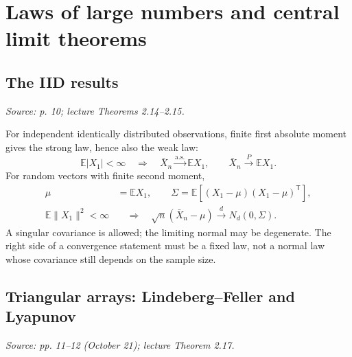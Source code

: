 \documentclass[12pt]{article}
\newcommand{\E}{\mathbb E}
\begin{document}
\section{Laws of large numbers and central limit theorems}
\subsection{The IID results}
\textit{Source: p. 10; lecture Theorems 2.14--2.15.}

For independent identically distributed observations, finite first absolute
moment gives the strong law, hence also the weak law:
\begin{equation}
 \E|X_1|<\infty\quad\Longrightarrow\quad
 \bar X_n\xrightarrow{\mathrm{a.s.}}\E X_1,
 \qquad\bar X_n\xrightarrow{P}\E X_1.
\end{equation}
For random vectors with finite second moment,
\begin{align}
 \mu&=\E X_1,\qquad\Sigma=\E[(X_1-\mu)(X_1-\mu)^{\mathsf T}],\\
 \E\|X_1\|^2<\infty
 &\quad\Longrightarrow\quad\sqrt n(\bar X_n-\mu)\xrightarrow{d}N_d(0,\Sigma).
\end{align}
A singular covariance is allowed; the limiting normal may be degenerate.
The right side of a convergence statement must be a fixed law, not a normal
law whose covariance still depends on the sample size.

\subsection{Triangular arrays: Lindeberg--Feller and Lyapunov}
\textit{Source: pp. 11--12 (October 21); lecture Theorem 2.17.}
\end{document}
